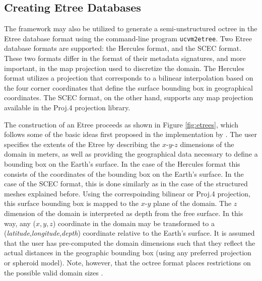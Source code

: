 


\subsection{Creating Etree Databases}

The framework may also be utilized to generate a semi-unstructured octree in the Etree database format \citep{Tu_2003_Tech} using the command-line program \texttt{ucvm2etree}. Two Etree database formats are supported: the Hercules format, and the SCEC format. These two formats differ in the format of their metadata signatures, and more important, in the map projection used to discretize the domain. The Hercules format utilizes a projection that corresponds to a bilinear interpolation based on the four corner coordinates that define the surface bounding box in geographical coordinates. The SCEC format, on the other hand, supports any map projection available in the Proj.4 projection library.

The construction of an Etree proceeds as shown in Figure \ref{fig:etrees}, which follows some of the basic ideas first proposed in the implementation by \citet{Taborda_2007_Proc}. The user specifies the extents of the Etree by describing the $x$-$y$-$z$ dimensions of the domain in meters, as well as providing the geographical data necessary to define a bounding box on the Earth's surface. In the case of the Hercules format this consists of the coordinates of the bounding box on the Earth's surface. In the case of the SCEC format, this is done similarly as in the case of the structured meshes explained before. Using the correspoinding bilinear or Proj.4 projection, this surface bounding box is mapped to the $x$-$y$ plane of the domain. The $z$ dimension of the domain is interpreted as depth from the free surface. In this way, any ($x,y,z$) coordinate in the domain may be transformed to a (\textit{latitude},\textit{longitude},\textit{depth}) coordinate relative to the Earth's surface. It is assumed that the user has pre-computed the domain dimensions such that they reflect the actual distances in the geographic bounding box (using any preferred projection or spheroid model). Note, however, that the octree format places restrictions on the possible valid domain sizes \citep{Tu_2003_Tech, Taborda_2007_Proc}.



